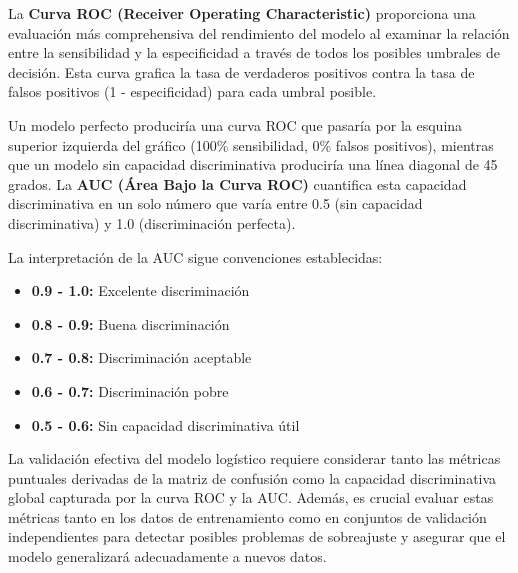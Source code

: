 \documentclass[
  letterpaper,
  DIV=11,
  numbers=noendperiod]{scrreprt}
\providecommand{\tightlist}{%
  \setlength{\itemsep}{0pt}\setlength{\parskip}{0pt}}
\begin{document}
La \textbf{Curva ROC (Receiver Operating Characteristic)} proporciona
una evaluación más comprehensiva del rendimiento del modelo al examinar
la relación entre la sensibilidad y la especificidad a través de todos
los posibles umbrales de decisión. Esta curva grafica la tasa de
verdaderos positivos contra la tasa de falsos positivos (1 -
especificidad) para cada umbral posible.

Un modelo perfecto produciría una curva ROC que pasaría por la esquina
superior izquierda del gráfico (100\% sensibilidad, 0\% falsos
positivos), mientras que un modelo sin capacidad discriminativa
produciría una línea diagonal de 45 grados. La \textbf{AUC (Área Bajo la
Curva ROC)} cuantifica esta capacidad discriminativa en un solo número
que varía entre 0.5 (sin capacidad discriminativa) y 1.0 (discriminación
perfecta).

La interpretación de la AUC sigue convenciones establecidas:

\begin{itemize}
\tightlist
\item
  \textbf{0.9 - 1.0:} Excelente discriminación
\item
  \textbf{0.8 - 0.9:} Buena discriminación\\
\item
  \textbf{0.7 - 0.8:} Discriminación aceptable
\item
  \textbf{0.6 - 0.7:} Discriminación pobre
\item
  \textbf{0.5 - 0.6:} Sin capacidad discriminativa útil
\end{itemize}

La validación efectiva del modelo logístico requiere considerar tanto
las métricas puntuales derivadas de la matriz de confusión como la
capacidad discriminativa global capturada por la curva ROC y la AUC.
Además, es crucial evaluar estas métricas tanto en los datos de
entrenamiento como en conjuntos de validación independientes para
detectar posibles problemas de sobreajuste y asegurar que el modelo
generalizará adecuadamente a nuevos datos.
\end{document}
